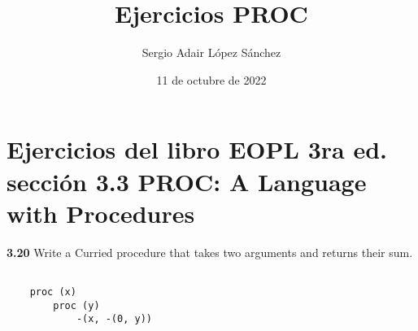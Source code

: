 \documentclass{article}
\title{Ejercicios PROC}
\author{Sergio Adair López Sánchez}
\date{11 de octubre de 2022}
\begin{document}
\maketitle

\section{Ejercicios del libro EOPL 3ra ed. sección 3.3 PROC: A Language with Procedures }

\textbf{3.20}  Write a Curried
procedure that takes two arguments and returns their sum.

\begin{verbatim}

    proc (x)
        proc (y)
            -(x, -(0, y))

\end{verbatim}
\end{document}
